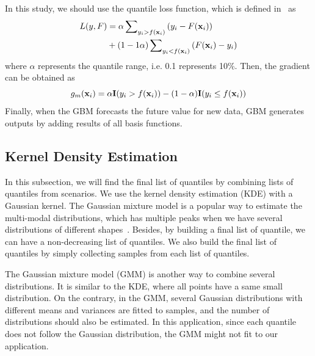 \documentclass[journal]{IEEEtran} %
\begin{document}
In this study, we should use the quantile loss function, which is defined in~\cite{Ridgeway} as
\begin{equation}
\begin{aligned}
\label{QuantileLossFunction}
L(y,F)&  = \alpha \sum\nolimits_{{y_i} > f({{\bf{x}}_i})} {({y_i} - F({{\bf{x}}_i}))}  \\ &  + (1 - 1\alpha )\sum\nolimits_{{y_i} < f({{\bf{x}}_i})} {(F({{\bf{x}}_i}) - {y_i})}
\end{aligned}
\end{equation}
where $\alpha$ represents the quantile range, i.e. 0.1 represents 10\%. Then, the gradient can be obtained as
\begin{equation}
\label{QuantileGradient}
{g_m}({{\bf{x}}_i}) = \alpha {\bf{I}}({y_i} > f({{\bf{x}}_i})) - (1 - \alpha ){\bf{I}}({y_i} \le f({{\bf{x}}_i}))
\end{equation}
Finally, when the GBM forecasts the future value for new data, GBM generates outputs by adding results of all basis functions.














\subsection{Kernel Density Estimation}
In this subsection, we will find the final list of quantiles by combining lists of quantiles from scenarios. We use the kernel density estimation (KDE) with a Gaussian kernel. The Gaussian mixture model is a popular way to estimate the multi-modal distributions, which has multiple peaks when we have several distributions of different shapes~\cite{Haben}. Besides, by building a final list of quantile, we can have a non-decreasing list of quantiles. We also build the final list of quantiles by simply collecting samples from each list of quantiles. 




The Gaussian mixture model (GMM) is another way to combine several distributions. It is similar to the KDE, where all points have a same small distribution. On the contrary, in the GMM, several Gaussian distributions with different means and variances are fitted to samples, and the number of distributions should also be estimated. In this application, since each quantile does not follow the Gaussian distribution, the GMM might not fit to our application.
\end{document}
